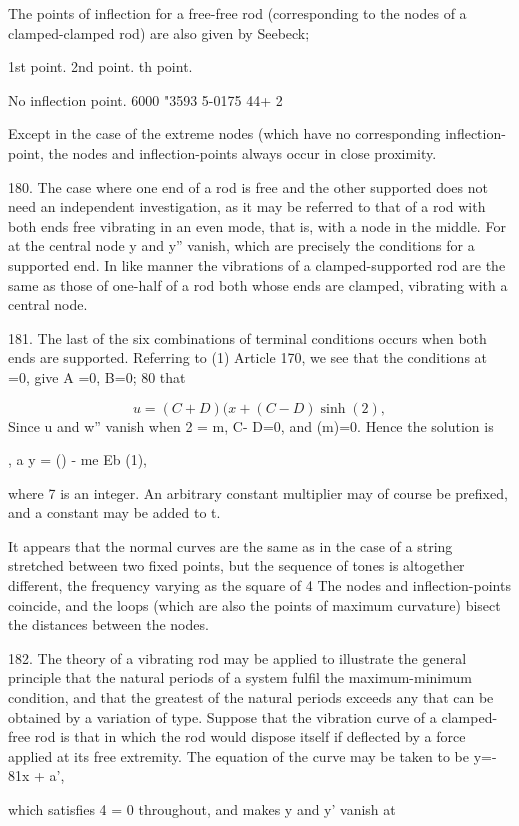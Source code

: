 The points of inflection for a free-free rod (corresponding to the nodes
of a clamped-clamped rod) are also given by Seebeck;

1st point. 2nd point. th point.

No inflection point. 6000 "3593 5-0175 44+ 2

Except in the case of the extreme nodes (which have no corresponding
inflection-point, the nodes and inflection-points always occur in close
proximity.

180. The case where one end of a rod is free and the other supported
does not need an independent investigation, as it may be
referred to that of a rod with both ends free vibrating in an even mode,
that is, with a node in the middle. For at the central node y and y''
vanish, which are precisely the conditions for a supported end. In like
manner the vibrations of a clamped-supported rod are the same as those
of one-half of a rod both whose ends are clamped, vibrating with a
central node.

181. The last of the six combinations of terminal conditions occurs when
both ends are supported. Referring to (1) Article 170, we see that the
conditions at =0, give A =0, B=0; 80 that

\[ u= (C+D) (x +(C-D) \sinh(2),\]
Since u and w'' vanish when 2 = m, C- D=0,
and (m)=0. Hence the solution is

, a y = () - me Eb (1),

where 7 is an integer. An arbitrary constant multiplier may of course be
prefixed, and a constant may be added to t.

It appears that the normal curves are the same as in the case of a
string stretched between two fixed points, but the sequence of tones is
altogether different, the frequency varying as the square of 4 The nodes
and inflection-points coincide, and the loops (which are also the points
of maximum curvature) bisect the distances between the nodes.

182. The theory of a vibrating rod may be applied to illustrate the
general principle that the natural periods of a system fulfil the
maximum-minimum condition, and that the greatest of the natural periods
exceeds any that can be obtained by a variation of type. Suppose that
the vibration curve of a clamped-free rod is that in which the rod would
dispose itself if deflected by a force applied at its free extremity.
The equation of the curve may be taken to be y=- 81x + a',

which satisfies 4 = 0 throughout, and makes y and y' vanish at

